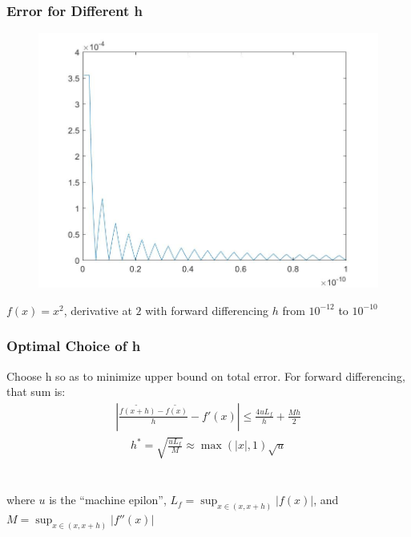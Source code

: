\documentclass{beamer}
\begin{document}
\begin{frame}
	\frametitle{Error for Different h}
	\begin{figure}
		\centering
			\includegraphics[scale=0.28]{error_diff_sqrt_x}
	\end{figure}
	$f(x) = x^2$, derivative at $2$ with forward differencing
	$h$ from $10^{-12}$ to $10^{-10}$
\end{frame}


\begin{frame}
\frametitle{Optimal Choice of h}

Choose h so as to minimize upper bound on total error.  For forward differencing, that sum is:\\
\begin{align*}
\left\lvert \frac{\widetilde{f(x+h)} - \widetilde{f(x)}}{h}-  f'(x) \right\rvert \leq \frac{4uL_f}{h} + \frac{Mh}{2}
\end{align*}
\begin{align*}
h^* = \sqrt{\frac{uL_f}{M}} \approx \max({\lvert x \rvert , 1}) \sqrt{u}
\end{align*}
\hfill\\
\hfill\\
where $u$ is the ``machine epilon'', $L_f = \sup_{x\in(x,x+h)} |f(x)|$, and $M = \sup_{x\in(x,x+h)} |f''(x)|$

\end{frame}
\end{document}
